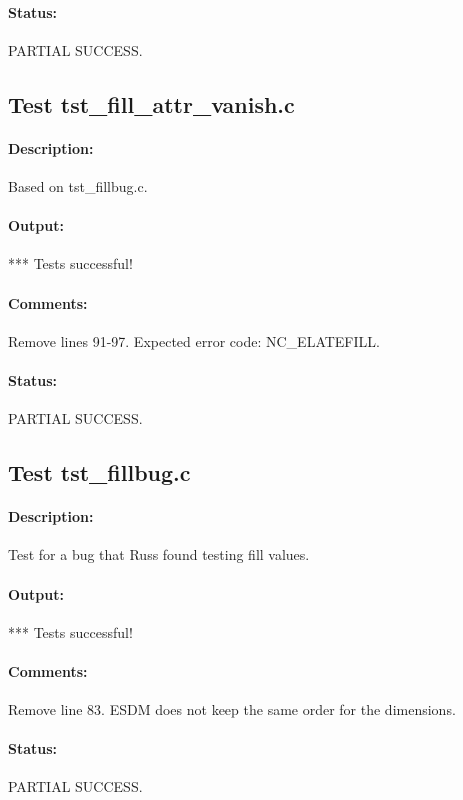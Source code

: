 \paragraph{Status:} PARTIAL SUCCESS.

\subsection{Test tst\_fill\_attr\_vanish.c}

\paragraph{Description:} Based on tst\_fillbug.c.

\paragraph{Output:} *** Tests successful!

\paragraph{Comments:} Remove lines 91-97. Expected error code: NC\_ELATEFILL.

\paragraph{Status:} PARTIAL SUCCESS.

\subsection{Test tst\_fillbug.c}

\paragraph{Description:} Test for a bug that Russ found testing fill values.

\paragraph{Output:} *** Tests successful!

\paragraph{Comments:} Remove line 83. ESDM does not keep the same order for the dimensions.

\paragraph{Status:} PARTIAL SUCCESS.

